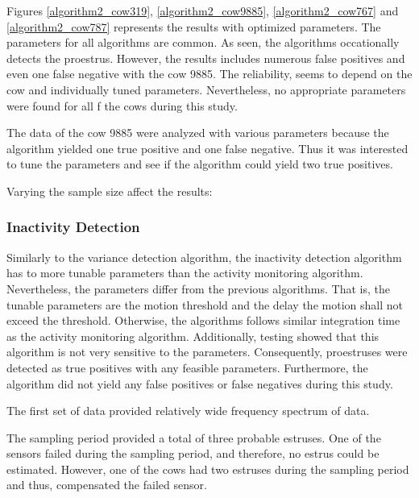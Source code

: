 \documentclass[english,12pt,a4paper,pdftex,elec,utf8]{aaltothesis}
\begin{document}
Figures \ref{algorithm2_cow319}, \ref{algorithm2_cow9885}, \ref{algorithm2_cow767} and \ref{algorithm2_cow787} represents the results with optimized parameters. The parameters for all algorithms are common. As seen, the algorithms occationally detects the proestrus. However, the results includes numerous false positives and even one false negative with the cow 9885. The reliability, seems to depend on the cow and individually tuned parameters. Nevertheless, no appropriate parameters were found for all f the cows during this study.

The data of the cow 9885 were analyzed with various parameters because the algorithm yielded one true positive and one false negative. Thus it was interested to tune the parameters and see if the algorithm could yield two true positives.


Varying the sample size affect the results:







\subsubsection{Inactivity Detection} \label{inactivitydetectionevaluation}

Similarly to the variance detection algorithm, the inactivity detection algorithm has to more tunable parameters than the activity monitoring algorithm. Nevertheless, the parameters differ from the previous algorithms. That is, the tunable parameters are the motion threshold and the delay the motion shall not exceed the threshold. Otherwise, the algorithms follows similar integration time as the activity monitoring algorithm. Additionally, testing showed that this algorithm is not very sensitive to the parameters. Consequently, proestruses were detected as true positives with any feasible parameters. Furthermore, the algorithm did not yield any false positives or false negatives during this study.









The first set of data provided relatively wide frequency spectrum of data.



The sampling period provided a total of three probable estruses. One of the sensors failed during the sampling period, and therefore, no estrus could be estimated. However, one of the cows had two estruses during the sampling period and thus, compensated the failed sensor.
\end{document}

